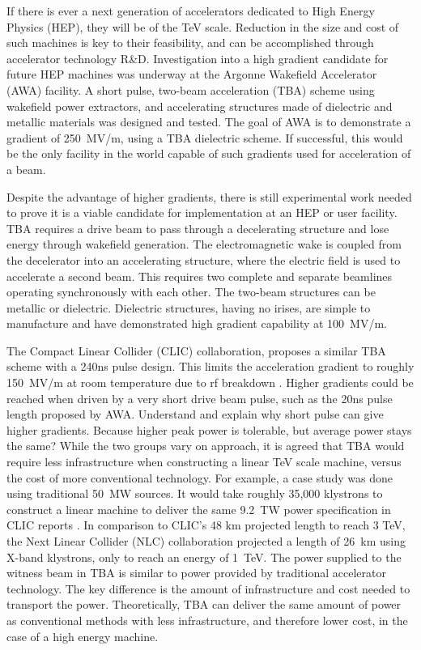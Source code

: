 \documentclass{iitthesis}
\newcommand{\nrnote}[1]{\textsf{{\color{blue}{ NN note:}   #1 }}}
\begin{document}
If there is ever a next generation of accelerators dedicated to High Energy Physics
(HEP), they will be of the TeV scale. Reduction in the size and cost
of such machines is key to their feasibility, and can be accomplished
through accelerator technology R\&D. Investigation into a 
high gradient candidate for future HEP machines was underway
at the Argonne Wakefield Accelerator (AWA) facility. A
short pulse, two-beam acceleration (TBA) scheme using 
wakefield power extractors, and accelerating structures made 
of dielectric and metallic materials was designed and tested. 
The goal of AWA is to demonstrate a gradient of
\SI{250}{MV/m}, using a TBA dielectric scheme. If successful, this would
be the only facility in the world capable of such gradients used for
acceleration of a beam.

Despite the advantage of higher gradients, there is still experimental work
needed to prove it is a viable candidate for implementation at an HEP or user facility.
TBA requires a drive beam to pass through a decelerating structure and
lose energy through wakefield generation. The electromagnetic wake
is coupled from the decelerator into an accelerating structure, where
the electric field is used to accelerate a second beam. This requires
two complete and separate beamlines operating synchronously with each other.  
The two-beam structures can be metallic or dielectric. Dielectric
structures, having no irises, are simple to manufacture and have demonstrated
high gradient capability at \SI{100}{MV/m}. %

The Compact Linear Collider (CLIC) collaboration, proposes a similar TBA scheme with
a 240ns pulse design. This limits the acceleration gradient
to roughly \SI{150}{MV/m} at room temperature due to rf breakdown \cite{CLICdesignReport}.
Higher gradients could be reached when driven by a very short drive
beam pulse, such as the 20ns pulse length proposed by AWA. %
\nrnote{Understand and explain why short pulse can give higher gradients. 
Because higher peak power is tolerable, but average power stays the same?}
While the two groups vary on approach, it is agreed that TBA would 
require less infrastructure when constructing a linear TeV scale machine, 
versus the cost of more conventional technology. 
For example, a case study was done using traditional \SI{50}{MW} sources.
It would take roughly 35,000 klystrons to construct a linear machine to deliver the same 
\SI{9.2}{TW} power specification in CLIC reports \cite{CLICdesignReport}. 
In comparison to CLIC's 48 km projected length to reach 3 TeV, the Next Linear
Collider (NLC) collaboration projected a length of \SI{26}{km} using X-band klystrons,
only to reach an energy of \SI{1}{TeV}. %
The power supplied to the witness beam in TBA is similar to
power provided by traditional accelerator technology. 
The key difference is the amount of infrastructure and cost 
needed to transport the power. Theoretically, TBA can deliver
the same amount of power as conventional methods with less 
infrastructure, and therefore lower cost, in the case of a high energy machine. 
\end{document}
